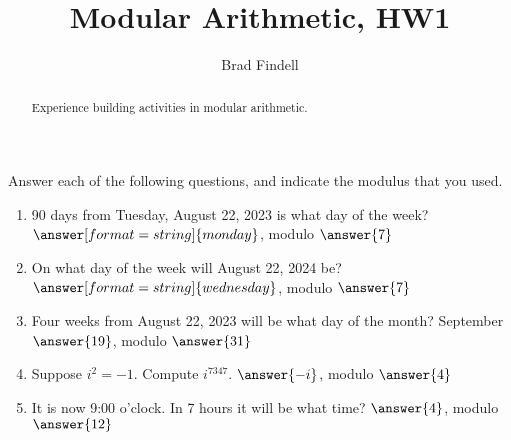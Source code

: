 \documentclass[space,nooutcomes,handout]{ximera}
\title{Modular Arithmetic, HW1}
\author{Brad Findell}
\begin{document}
\begin{abstract}
Experience building activities in modular arithmetic.  
\end{abstract}
\maketitle

\begin{problem}
Answer each of the following questions, and indicate the modulus that you used.  
\begin{enumerate}
\item 90 days from Tuesday, August 22, 2023 is what day of the week?  $\answer[format=string]{monday}$, modulo $\answer{7}$
\item On what day of the week will August 22, 2024 be? $\answer[format=string]{wednesday}$, modulo $\answer{7}$
\item Four weeks from August 22, 2023 will be what day of the month? September $\answer{19}$, modulo $\answer{31}$
\item Suppose $i^2 = -1$.  Compute $i^{7347}$. $\answer{-i}$, modulo $\answer{4}$
\item It is now 9:00 o'clock.  In 7 hours it will be what time? $\answer{4}$, modulo $\answer{12}$
\end{enumerate}
\end{problem}
\end{document}
